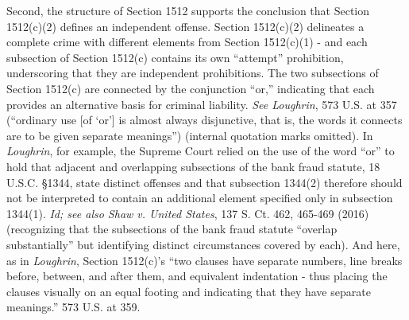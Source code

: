 Second, the structure of Section 1512 supports the conclusion that Section 1512(c)(2) defines an independent offense.
Section 1512(c)(2) delineates a complete crime with different elements from Section 1512(c)(1) - and each subsection of Section 1512(c) contains its own “attempt” prohibition, underscoring that they are independent prohibitions.
The two subsections of Section 1512(c) are connected by the conjunction “or,” indicating that each provides an alternative basis for criminal liability.
\textit{See Loughrin}, 573 U.S. at 357 (“ordinary use [of ‘or’] is almost always disjunctive, that is, the words it connects are to be given separate meanings”) (internal quotation marks omitted).
In \textit{Loughrin}, for example, the Supreme Court relied on the use of the word “or” to hold that adjacent and overlapping subsections of the bank fraud statute, 18 U.S.C. \S 1344, state distinct offenses and that subsection 1344(2) therefore should not be interpreted to contain an additional element specified only in subsection 1344(1).
\textit{Id; see also Shaw v. United States}, 137 S. Ct. 462, 465-469 (2016) (recognizing that the subsections of the bank fraud statute “overlap substantially” but identifying distinct circumstances covered by each).%
And here, as in \textit{Loughrin}, Section 1512(c)’s “two clauses have separate numbers, line breaks before, between, and after them, and equivalent indentation - thus placing the clauses visually on an equal footing and indicating that they have separate meanings.” 573 U.S. at 359.

